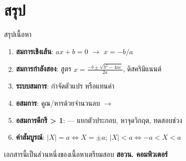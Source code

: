 \documentclass[11pt, aspectratio=169]{beamer}
\begin{document}
\section{สรุป}

\begin{frame}{สรุปเนื้อหา}
  \begin{explanation}[สิ่งที่ได้เรียนรู้]
    \begin{enumerate}
      \item \textbf{สมการเชิงเส้น}: $ax + b = 0$ $\rightarrow$ $x = -b/a$
      \item \textbf{สมการกำลังสอง}: สูตร $x = \frac{-b \pm \sqrt{b^2-4ac}}{2a}$, ดิสคริมิแนนต์
      \item \textbf{ระบบสมการ}: กำจัดตัวแปร หรือแทนค่า
      \item \textbf{อสมการ}: คูณ/หารด้วยจำนวนลบ $\rightarrow$ 
      \item \textbf{อสมการดีกรี > 1}:  — แยกตัวประกอบ, หาจุดวิกฤต, ทดสอบช่วง
      \item \textbf{ค่าสัมบูรณ์}: $|X| = a \iff X=\pm a$; \; $|X|<a \iff -a<X<a$
    \end{enumerate}
  \end{explanation}

  \begin{center}
    \large เอกสารนี้เป็นส่วนหนึ่งของเนื้อหาเตรียมสอบ \textbf{สอวน. คอมพิวเตอร์}
  \end{center}
\end{frame}
\end{document}
